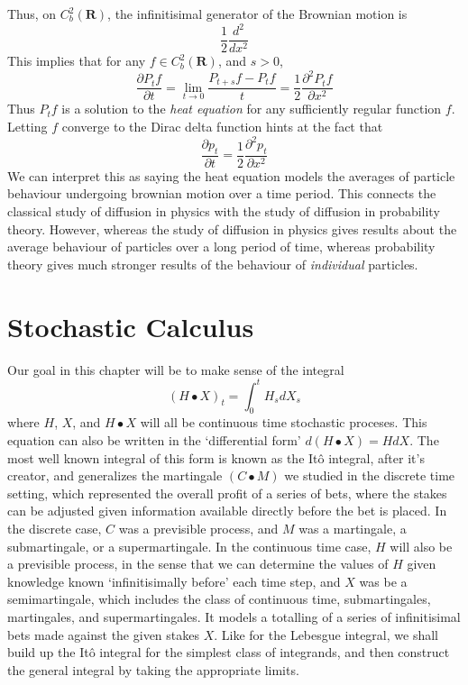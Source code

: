 %
Thus, on $C_b^2(\mathbf{R})$, the infinitisimal generator of the Brownian motion is
%
\[ \frac{1}{2} \frac{d^2}{dx^2} \]
%
This implies that for any $f \in C_b^2(\mathbf{R})$, and $s > 0$,
%
\[ \frac{ \partial P_tf}{\partial t} = \lim_{t \to 0} \frac{P_{t+s}f - P_tf}{t} = \frac{1}{2} \frac{\partial^2 P_t f}{\partial x^2} \]
%
Thus $P_tf$ is a solution to the {\it heat equation} for any sufficiently regular function $f$. Letting $f$ converge to the Dirac delta function hints at the fact that
%
\[ \frac{\partial p_t}{\partial t} = \frac{1}{2} \frac{\partial^2 p_t}{\partial x^2} \]
%
We can interpret this as saying the heat equation models the averages of particle behaviour undergoing brownian motion over a time period. This connects the classical study of diffusion in physics with the study of diffusion in probability theory. However, whereas the study of diffusion in physics gives results about the average behaviour of particles over a long period of time, whereas probability theory gives much stronger results of the behaviour of {\it individual} particles.

\chapter{Stochastic Calculus}

Our goal in this chapter will be to make sense of the integral
%
\[ (H \bullet X)_t = \int_0^t H_s dX_s \]
%
where $H$, $X$, and $H \bullet X$ will all be continuous time stochastic proceses. This equation can also be written in the `differential form' $d(H \bullet X) = H dX$. The most well known integral of this form is known as the It\^{o} integral, after it's creator, and generalizes the martingale $(C \bullet M)$ we studied in the discrete time setting, which represented the overall profit of a series of bets, where the stakes can be adjusted given information available directly before the bet is placed. In the discrete case, $C$ was a previsible process, and $M$ was a martingale, a submartingale, or a supermartingale. In the continuous time case, $H$ will also be a previsible process, in the sense that we can determine the values of $H$ given knowledge known `infinitisimally before' each time step, and $X$ was be a semimartingale, which includes the class of continuous time, submartingales, martingales, and supermartingales. It models a totalling of a series of infinitisimal bets made against the given stakes $X$. Like for the Lebesgue integral, we shall build up the It\^{o} integral for the simplest class of integrands, and then construct the general integral by taking the appropriate limits.


